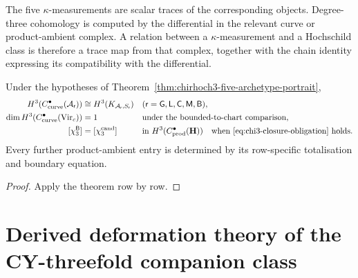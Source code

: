 \begin{remark}
\label{rem:chirhoch3-archetype-zeroes-forced}
The five \(\kappa\)-measurements are scalar traces of the corresponding
objects.  Degree-three cohomology is computed by the differential in
the relevant curve or product-ambient complex.  A relation between a
\(\kappa\)-measurement and a Hochschild class is therefore a trace map
from that complex, together with the chain identity expressing its
compatibility with the differential.
\end{remark}

\begin{corollary}
\label{cor:chirhoch3-unified-formula}
\ClaimStatusConditional
Under the hypotheses of
Theorem~\ref{thm:chirhoch3-five-archetype-portrait},
\begin{equation}
\label{eq:chirhoch3-unified}
 \begin{aligned}
 H^3(C^\bullet_{\mathrm{curve}}(\mathcal A_{\mathsf r}))
 &\cong H^3(K_{\mathcal A_{\mathsf r},S_{\mathsf r}})
 &&(\mathsf r=\mathsf G,\mathsf L,\mathsf C,\mathsf M,\mathsf B),\\
 \dim H^3(C^\bullet_{\mathrm{curve}}(\operatorname{Vir}_c))&=1
 &&\text{under the bounded-to-chart comparison},\\
 [\chi_3^{\mathsf B}]&=[\chi_3^{\mathrm{cand}}]
 &&\text{in }H^3(C^\bullet_{\mathrm{prod}}(\mathbf H))
 \quad\text{when \eqref{eq:chi3-closure-obligation} holds.}
 \end{aligned}
\end{equation}
Every further product-ambient entry is determined by its row-specific
totalisation and boundary equation.
\end{corollary}

\begin{proof}
Apply the theorem row by row.
\end{proof}
\section{Derived deformation theory of the CY-threefold companion class}
\label{sec:chirhoch3-Delta5-derived-deformation-sixth-path}

\providecommand{\FMP}{\mathrm{FMP}}
\providecommand{\dgArt}{\mathrm{dgArt}_{/k}^{\le 0}}
\providecommand{\LMC}{\mathbf{MC}^{L_\infty}}
\providecommand{\TangCplx}{\mathbb T}
\providecommand{\gBor}{\mathfrak g_{\mathrm{Bor}}}

